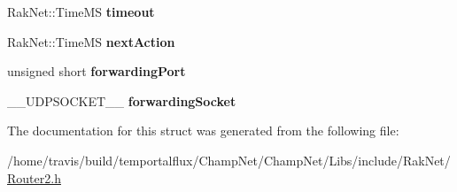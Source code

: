 \begin{DoxyCompactItemize}
\item 
\hypertarget{struct_rak_net_1_1_router2_1_1_mini_punch_request_abd0a8e93cb571a127a96f70deb1fd914}{Rak\-Net\-::\-Time\-M\-S {\bfseries timeout}}\label{struct_rak_net_1_1_router2_1_1_mini_punch_request_abd0a8e93cb571a127a96f70deb1fd914}

\item 
\hypertarget{struct_rak_net_1_1_router2_1_1_mini_punch_request_a9d6bdba3cb5b7b8997dc2e820f685a68}{Rak\-Net\-::\-Time\-M\-S {\bfseries next\-Action}}\label{struct_rak_net_1_1_router2_1_1_mini_punch_request_a9d6bdba3cb5b7b8997dc2e820f685a68}

\item 
\hypertarget{struct_rak_net_1_1_router2_1_1_mini_punch_request_a8ed89f73bd2b90ea14549959873ee04f}{unsigned short {\bfseries forwarding\-Port}}\label{struct_rak_net_1_1_router2_1_1_mini_punch_request_a8ed89f73bd2b90ea14549959873ee04f}

\item 
\hypertarget{struct_rak_net_1_1_router2_1_1_mini_punch_request_a320464f34f6284217ececa3bdcfa4986}{\-\_\-\-\_\-\-U\-D\-P\-S\-O\-C\-K\-E\-T\-\_\-\-\_\- {\bfseries forwarding\-Socket}}\label{struct_rak_net_1_1_router2_1_1_mini_punch_request_a320464f34f6284217ececa3bdcfa4986}

\end{DoxyCompactItemize}


The documentation for this struct was generated from the following file\-:\begin{DoxyCompactItemize}
\item 
/home/travis/build/temportalflux/\-Champ\-Net/\-Champ\-Net/\-Libs/include/\-Rak\-Net/\hyperlink{_router2_8h}{Router2.\-h}\end{DoxyCompactItemize}
